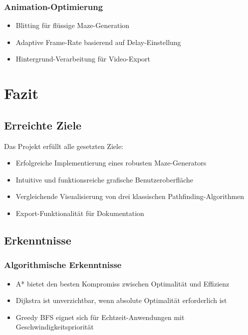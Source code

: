 \documentclass[12pt,a4paper]{article}
\begin{document}
\subsubsection{Animation-Optimierung}
\begin{itemize}
    \item Blitting für flüssige Maze-Generation
    \item Adaptive Frame-Rate basierend auf Delay-Einstellung
    \item Hintergrund-Verarbeitung für Video-Export
\end{itemize}

\section{Fazit}

\subsection{Erreichte Ziele}

Das Projekt erfüllt alle gesetzten Ziele:
\begin{itemize}
    \item Erfolgreiche Implementierung eines robusten Maze-Generators
    \item Intuitive und funktionsreiche grafische Benutzeroberfläche
    \item Vergleichende Visualisierung von drei klassischen Pathfinding-Algorithmen
    \item Export-Funktionalität für Dokumentation
\end{itemize}

\subsection{Erkenntnisse}

\subsubsection{Algorithmische Erkenntnisse}
\begin{itemize}
    \item A* bietet den besten Kompromiss zwischen Optimalität und Effizienz
    \item Dijkstra ist unverzichtbar, wenn absolute Optimalität erforderlich ist
    \item Greedy BFS eignet sich für Echtzeit-Anwendungen mit Geschwindigkeitspriorität
\end{itemize}
\end{document}
